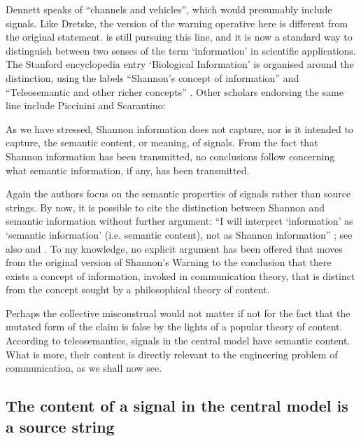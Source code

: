 \noindent Dennett speaks of ``channels and vehicles'', which would presumably include signals.
Like Dretske, the version of the warning operative here is different from the original statement.
\citet[$\S$6]{dennett2017bacteria} is still pursuing this line, and it is now a standard way to 
distinguish between two senses of the term `information' in scientific applications.
The Stanford encyclopedia entry `Biological Information' is organised around the distinction, using the labels ``Shannon's concept of information'' and ``Teleosemantic and other richer concepts'' \citep{godfrey-smith2016biological}.
Other scholars endorsing the same line include Piccinini and Scarantino:

\begin{myquote}
As we have stressed, Shannon information does not capture, nor is it intended to capture, the semantic content, or meaning, of signals. From the fact that Shannon information has been transmitted, no conclusions follow concerning what semantic information, if any, has been transmitted.
\par\hspace*{\fill}\citet[21]{piccinini2011information}
\end{myquote}

\noindent Again the authors focus on the semantic properties of signals rather than source strings.
By now, it is possible to cite the distinction between Shannon and semantic information without further argument: ``I will interpret ‘information’ as ‘semantic information’ (i.e. semantic content), not as Shannon information'' \citep[p. 12 n. 14]{artiga2020signals}; see also \citet[6]{cao2020new} and \citet[1]{kolchinsky2018semantic}.
To my knowledge, no explicit argument has been offered that moves from the original version of {\sc Shannon's Warning} to the conclusion that there exists a concept of information, invoked in communication theory, that is distinct from the concept sought by a philosophical theory of content.

Perhaps the collective misconstrual would not matter if not for the fact that the mutated form of the claim is false by the lights of a popular theory of content.
According to teleosemantics, signals in the central model have semantic content.
What is more, their content is directly relevant to the engineering problem of communication, as we shall now see.


\subsection{The content of a signal in the central model is a source string}\label{subsec:signalContent}

